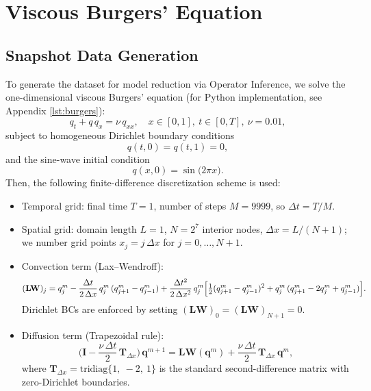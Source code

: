 \section{Viscous Burgers' Equation}
\label{sec:burgers}


\subsection*{Snapshot Data Generation}

To generate the dataset for model reduction via Operator Inference, we solve the one-dimensional viscous Burgers’ equation (for Python implementation, see Appendix \ref{lst:burgers}):\\
$$q_t + q\,q_x = \nu\,q_{xx}, \quad x\in[0,1],~t\in[0,T],~\nu=0.01,$$
subject to homogeneous Dirichlet boundary conditions\\
$$q(t,0) = q(t,1) = 0,$$
and the sine-wave initial condition\\
$$q(x,0) = \sin\bigl(2\pi x\bigr).$$
Then, the following finite-difference discretization scheme is used:
\begin{itemize}
  \item Temporal grid: final time $T=1$, number of steps $M=9999$, so $\Delta t = T/M$.
  \item Spatial grid: domain length $L=1$, $N=2^7$ interior nodes, $\Delta x = L/(N+1)$; we number grid points $x_j = j\,\Delta x$ for $j=0,\ldots,N+1$.
  \item Convection term (Lax–Wendroff):\\
    $$(\mathbf{LW})_j = q_j^m
      - \frac{\Delta t}{2\,\Delta x}\,q_j^m\,(q_{j+1}^m - q_{j-1}^m)
      + \frac{\Delta t^2}{2\,\Delta x^2}\,q_j^m
        \Bigl[\tfrac12(q_{j+1}^m - q_{j-1}^m)^2
               + q_j^m\,(q_{j+1}^m - 2q_j^m + q_{j-1}^m)\Bigr].$$
    Dirichlet BCs are enforced by setting $(\mathbf{LW})_0 = (\mathbf{LW})_{N+1} = 0$.
  \item Diffusion term (Trapezoidal rule):\\
    $$\Biggl(\mathbf{I} - \dfrac{\nu\,\Delta t}{2}\,\mathbf{T}_{\Delta x}\Biggr)\,\mathbf{q}^{m+1}
      = \mathbf{LW}(\mathbf{q}^m) + \dfrac{\nu\,\Delta t}{2}\,\mathbf{T}_{\Delta x}\,\mathbf{q}^m,$$
    where $\mathbf{T}_{\Delta x}=\text{tridiag}\{1,~-2,~1\}$ is the standard second-difference matrix with zero-Dirichlet boundaries.
\end{itemize}
 
